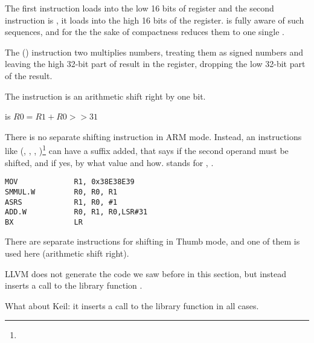 The first instruction loads  into the low 16 bits of register and the second instruction is
, it loads  into the high 16 bits of the register.
\IDA is fully aware of such sequences, and for the the sake of compactness reduces them to one single .

The  () 
instruction two multiplies numbers, treating them as signed numbers
and leaving the high 32-bit part of result in the  register,
dropping the low 32-bit part of the result.

The instruction is an arithmetic shift right by one bit.

 is $R0=R1 + R0>>31$

\label{shifts_in_ARM_mode}

There is no separate shifting instruction in ARM mode.
Instead, an instructions like 
(\MOV, \ADD, \SUB, )\footnote{\DataProcessingInstructionsFootNote}
can have a suffix added, that says if the second operand must be shifted, and if yes, by what value and how.
 stands for , \EMDASH{}.

\subsectionold{\OptimizingXcodeIV (\ThumbTwoMode)}

\begin{lstlisting}
MOV             R1, 0x38E38E39
SMMUL.W         R0, R0, R1
ASRS            R1, R0, #1
ADD.W           R0, R1, R0,LSR#31
BX              LR
\end{lstlisting}


There are separate instructions for shifting in Thumb mode, 
and one of them is used here\EMDASH{} (arithmetic shift right).


\NonOptimizing LLVM
does not generate the code we saw before in this section, but instead inserts a call to the library function 
.

What about Keil: it inserts a call to the library function  in all cases.

